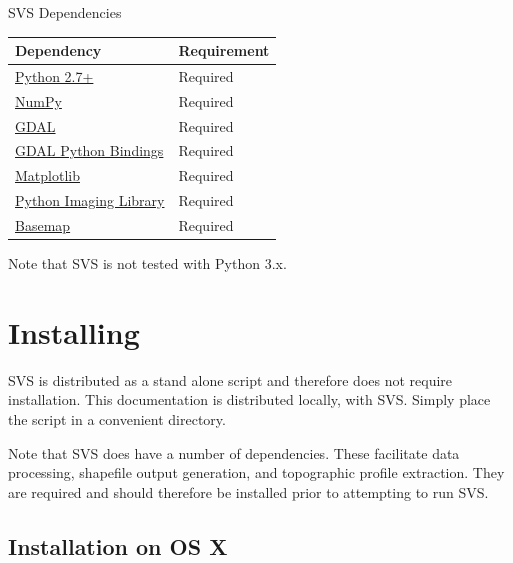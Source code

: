 \documentclass[letterpaper,10pt,english]{sphinxmanual}
\begin{document}
\begin{threeparttable}
\capstart\caption{SVS Dependencies}

\begin{tabulary}{\linewidth}{|L|L|}
\hline
\textbf{
Dependency
} & \textbf{
Requirement
}\\\hline

\href{http://www.python.org}{Python 2.7+}
 & 
Required
\\\hline

\href{http://numpy.scipy.org/}{NumPy}
 & 
Required
\\\hline

\href{http://gdal.org/}{GDAL}
 & 
Required
\\\hline

\href{http://pypi.python.org/pypi/GDAL/}{GDAL Python Bindings}
 & 
Required
\\\hline

\href{http://matplotlib.org/users/installing.html}{Matplotlib}
 & 
Required
\\\hline

\href{https://developers.google.com/appengine/docs/python/images/installingPIL}{Python Imaging Library}
 & 
Required
\\\hline

\href{http://matplotlib.org/basemap/users/installing.html}{Basemap}
 & 
Required
\\\hline
\end{tabulary}

\end{threeparttable}


Note that SVS is not tested with Python 3.x.


\section{Installing}
\label{Installation:installing}
SVS is distributed as a stand alone script and therefore does not require installation.  This documentation is distributed locally, with SVS.  Simply place the script in a convenient directory.

Note that SVS does have a number of dependencies.  These facilitate data processing, shapefile output generation, and topographic profile extraction.  They are required and should therefore be installed prior to attempting to run SVS.


\subsection{Installation on OS X}
\label{Installation:installation-on-os-x}
\end{document}

